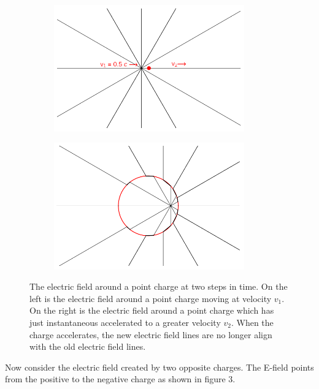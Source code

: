 \documentclass[12pt]{article}
\begin{document}
\begin{figure}[h]
    \begin{subfigure}{0.5\textwidth}
    \centering
    	\includegraphics[width=0.9\textwidth]{charge-moving-at-v1.png}
    \end{subfigure}
    \begin{subfigure}{0.5\textwidth}
    	\centering
    	\includegraphics[width=0.9\textwidth]{charge-moving-at-v2.png}
    \end{subfigure}
    \caption{The electric field around a point charge at two steps in time. On the left is the electric field around a point charge moving at velocity $v_1$. On the right is the electric field around a point charge which has just instantaneous accelerated to a greater velocity $v_2$. When the charge accelerates, the new electric field lines are no longer align with the old electric field lines. }
\end{figure} 

Now consider the electric field created by two opposite charges. The E-field points from the positive to the negative charge as shown in figure 3. 
\end{document}

